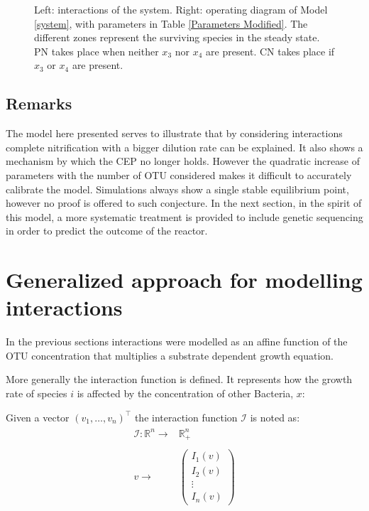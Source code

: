 \documentclass[3p,times]{elsarticle}
\newcommand{\R}{\mathbb{R}}
\newcommand{\I}{\mathcal{I}}
\begin{document}
\begin{figure}[ht]
\begin{subfigure}[b]{0.45\textwidth}
	\end{subfigure}
	\caption{Left: interactions of the system. Right: operating diagram of Model \eqref{system}, with parameters in Table \ref{Parameters Modified}. The different zones represent the surviving species in the steady state. PN takes place when neither $x_3$ nor $x_4$ are present. CN takes place if $x_3$ or $x_4$ are present.}
	\label{OD modified}
\end{figure}
\clearpage

\subsection{Remarks}
The model here presented serves to illustrate that by considering interactions complete nitrification with a bigger dilution rate can be explained. It also shows a mechanism by which the CEP no longer holds. However the quadratic increase of parameters with the number of OTU considered makes it difficult to accurately calibrate the model. Simulations always show a single stable equilibrium point, however no proof is offered to such conjecture. In the next section, in the spirit of this model, a more systematic treatment is provided to include genetic sequencing in order to predict the outcome of the reactor.


\section{Generalized approach for modelling interactions}
In the previous sections interactions were modelled as an affine function of the OTU concentration that multiplies a substrate dependent growth equation. 

More generally the interaction function is defined. It represents how the growth rate of species $i$ is affected by the concentration of other Bacteria, $x$:

Given a vector $(v_1,\dots,v_n)^\top$ the interaction function $\I$ is noted as:
\begin{align}
\begin{array}{rc}
\I: \R^n \rightarrow & \R_+^n\\
& \\
v \rightarrow & \begin{pmatrix}
I_1(v) \\
I_2(v) \\ 
\vdots  \\
I_n(v)
\end{pmatrix}
\end{array}
\end{align}
\end{document}
